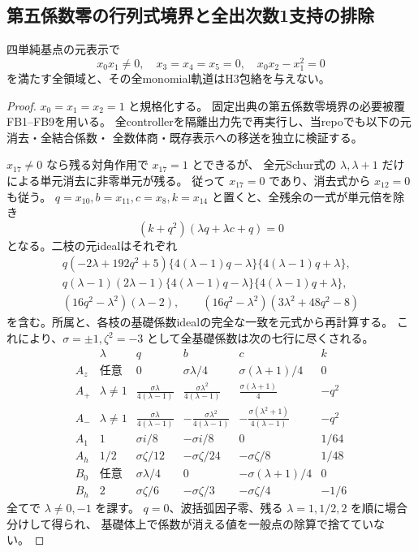 \subsection{第五係数零の行列式境界と全出次数1支持の排除}
\label{subsec:cubic-CY-four-point-zero-determinant}
\begin{theorem}\label{thm:cubic-CY-four-point-zero-determinant-empty}
四単純基点の元表示で
\[
 x_0x_1\ne0,\quad x_3=x_4=x_5=0,\quad x_0x_2-x_1^2=0
\]
を満たす全領域と、その全monomial軌道はH3包絡を与えない。
\end{theorem}
\begin{proof}
$x_0=x_1=x_2=1$ と規格化する。
固定出典\cite{AS4CYpinned}の第五係数零境界の必要被覆FB1--FB9を用いる。
全controllerを隔離出力先で再実行し、当repoでも以下の元消去・全結合係数・
全数体商・既存表示への移送を独立に検証する。

$x_{17}\ne0$ なら残る対角作用で $x_{17}=1$ とできるが、
全元Schur式の $\lambda,\lambda+1$ だけによる単元消去に非零単元が残る。
従って $x_{17}=0$ であり、消去式から $x_{12}=0$ も従う。
$q=x_{10},b=x_{11},c=x_8,k=x_{14}$ と置くと、全残余の一式が単元倍を除き
\[
 (k+q^2)(\lambda q+\lambda c+q)=0
\]
となる。二枝の元idealはそれぞれ
\[
\begin{gathered}
 q(-2\lambda+192q^2+5)
 \{4(\lambda-1)q-\lambda\}\{4(\lambda-1)q+\lambda\},\\
 q(\lambda-1)(2\lambda-1)
 \{4(\lambda-1)q-\lambda\}\{4(\lambda-1)q+\lambda\},\\
 (16q^2-\lambda^2)(\lambda-2),\qquad
 (16q^2-\lambda^2)(3\lambda^2+48q^2-8)
\end{gathered}
\]
を含む。所属と、各枝の基礎係数idealの完全な一致を元式から再計算する。
これにより、$\sigma=\pm1,\zeta^2=-3$ として全基礎係数は次の七行に尽くされる。
\[
\begin{array}{c|c|c|c|c|c}
 &\lambda&q&b&c&k\\\hline
 A_z&\text{任意}&0&\sigma\lambda/4&\sigma(\lambda+1)/4&0\\
 A_+&\lambda\ne1&\frac{\sigma\lambda}{4(\lambda-1)}&
 \frac{\sigma\lambda^2}{4(\lambda-1)}&\frac{\sigma(\lambda+1)}4&-q^2\\
 A_-&\lambda\ne1&\frac{\sigma\lambda}{4(\lambda-1)}&
 -\frac{\sigma\lambda^2}{4(\lambda-1)}&-\frac{\sigma(\lambda^2+1)}{4(\lambda-1)}&-q^2\\
 A_1&1&\sigma i/8&-\sigma i/8&0&1/64\\
 A_h&1/2&\sigma\zeta/12&-\sigma\zeta/24&-\sigma\zeta/8&1/48\\
 B_0&\text{任意}&\sigma\lambda/4&0&-\sigma(\lambda+1)/4&0\\
 B_h&2&\sigma\zeta/6&-\sigma\zeta/3&-\sigma\zeta/4&-1/6
\end{array}
\]
全てで $\lambda\ne0,-1$ を課す。
$q=0$、波括弧因子零、残る $\lambda=1,1/2,2$ を順に場合分けして得られ、
基礎体上で係数が消える値を一般点の除算で捨てていない。


\end{proof}
